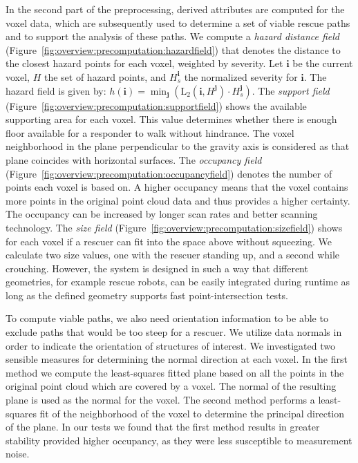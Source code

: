 \documentclass[review,journal]{vgtc}         %
\begin{document}
 In the second part of the preprocessing, derived attributes are computed for the voxel data, which are subsequently used to determine a set of viable rescue paths and to support the analysis of these paths. We compute a \emph{hazard distance field} (Figure~\ref{fig:overview:precomputation:hazardfield}) that denotes the distance to the closest hazard points for each voxel, weighted by severity. Let $\mathbf{i}$ be the current voxel, $H$ the set of hazard points, and $H^{\mathbf{i}}_s$ the normalized severity for $\mathbf{i}$. The hazard field is given by: $h(\mathbf{i}) = \min_\mathbf{j}(\mathrm{L}_2(\mathbf{i}, H^\mathbf{j}) \cdot H^\mathbf{j}_s)$. The \emph{support field} (Figure~\ref{fig:overview:precomputation:supportfield}) shows the available supporting area for each voxel. This value determines whether there is enough floor available for a responder to walk without hindrance. The voxel neighborhood in the plane perpendicular to the gravity axis is considered as that plane coincides with horizontal surfaces. The \emph{occupancy field} (Figure~\ref{fig:overview:precomputation:occupancyfield}) denotes the number of  points each voxel is based on. A higher occupancy means that the voxel contains more points in the original point cloud data and thus provides a higher certainty. The occupancy can be increased by longer scan rates and better scanning technology. The \emph{size field} (Figure~\ref{fig:overview:precomputation:sizefield}) shows for each voxel if a rescuer can fit into the space above without squeezing. We calculate two size values, one with the rescuer standing up, and a second while crouching. However, the system is designed in such a way that different geometries, for example rescue robots, can be easily integrated during runtime as long as the defined geometry supports fast point-intersection tests. 

To compute viable paths, we also need orientation information to be able to exclude paths that would be too steep for a rescuer. We utilize data normals in order to indicate the orientation of structures of interest. We investigated two sensible measures for determining the normal direction at each voxel. In the first method we compute the least-squares fitted plane based on all the points in the original point cloud which are covered by a voxel. The normal of the resulting plane is used as the normal for the voxel. The second method performs a least-squares fit of the neighborhood of the voxel to determine the principal direction of the plane. In our tests we found that the first method results in greater stability provided higher occupancy, as they were less susceptible to measurement noise.
\end{document}
